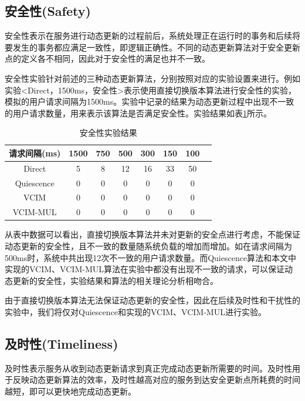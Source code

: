\documentclass[macfonts,master]{njuthesis}
\begin{document}
\subsection{安全性(Safety)}
安全性表示在服务进行动态更新的过程前后，系统处理正在运行时的事务和后续将要发生的事务都应满足一致性，即逻辑正确性。不同的动态更新算法对于安全更新点的定义各不相同，因此对于安全性的满足也并不一致。

安全性实验针对前述的三种动态更新算法，分别按照对应的实验设置来进行。例如实验<Direct，1500ms，安全性>表示使用直接切换版本算法进行安全性的实验，模拟的用户请求间隔为1500ms。实验中记录的结果为动态更新过程中出现不一致的用户请求数量，用来表示该算法是否满足安全性。实验结果如表\ref{table:safety_result}所示。

\begin{table}
  \centering
  \begin{tabular}{c|c|c|c|c|c|cp{20mm}}
    \hline
    \textbf{请求间隔(ms)} & 1500 & 750 & 500 & 300 & 150 & 100 \\
    \midrule
    \hline
    Direct  & 5 &  8  & 12 & 16 & 33 & 50 \\
    \hline
    Quiescence     & 0  &  0  & 0 & 0 & 0 & 0 \\
    \hline
    VCIM     & 0 & 0 & 0 & 0 & 0 & 0 \\
    \hline
    VCIM-MUL     & 0 & 0 & 0 & 0 & 0 & 0 \\
    \hline
  \end{tabular}
  \caption{安全性实验结果}
  \label{table:safety_result}
\end{table}

从表中数据可以看出，直接切换版本算法并未对更新的安全点进行考虑，不能保证动态更新的安全性，且不一致的数量随系统负载的增加而增加。如在请求间隔为500ms时，系统中共出现12次不一致的用户请求数量。而Quiescence算法和本文中实现的VCIM、VCIM-MUL算法在实验中都没有出现不一致的请求，可以保证动态更新的安全性，实验结果和算法的相关理论分析相吻合。

由于直接切换版本算法无法保证动态更新的安全性，因此在后续及时性和干扰性的实验中，我们将仅对Quiescence和实现的VCIM、VCIM-MUL进行实验。

\subsection{及时性(Timeliness)}
及时性表示服务从收到动态更新请求到真正完成动态更新所需要的时间。及时性用于反映动态更新算法的效率，及时性越高对应的服务到达安全更新点所耗费的时间越短，即可以更快地完成动态更新。
\end{document}
